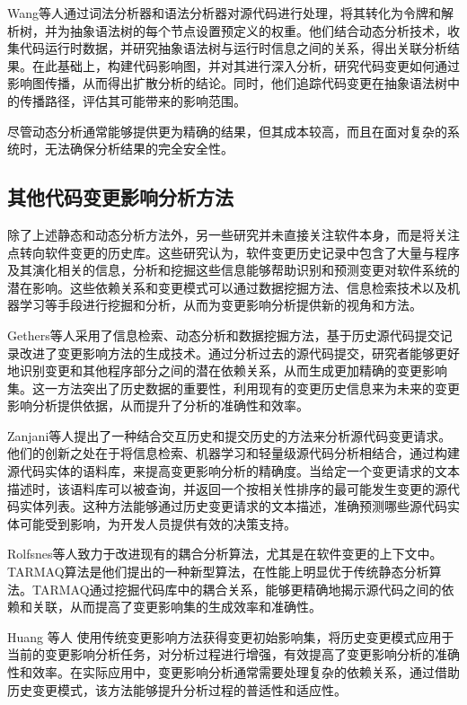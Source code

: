 Wang等人\cite{王海龙0一种基于代码树分析的代码影响范围分析方法}通过词法分析器和语法分析器对源代码进行处理，将其转化为令牌和解析树，并为抽象语法树的每个节点设置预定义的权重。他们结合动态分析技术，收集代码运行时数据，并研究抽象语法树与运行时信息之间的关系，得出关联分析结果。在此基础上，构建代码影响图，并对其进行深入分析，研究代码变更如何通过影响图传播，从而得出扩散分析的结论。同时，他们追踪代码变更在抽象语法树中的传播路径，评估其可能带来的影响范围。

尽管动态分析通常能够提供更为精确的结果，但其成本较高，而且在面对复杂的系统时，无法确保分析结果的完全安全性。

\subsection{其他代码变更影响分析方法}

除了上述静态和动态分析方法外，另一些研究并未直接关注软件本身，而是将关注点转向软件变更的历史库\cite{2011An, Markus2017Supporting, 2008Mining, 2014Impact, 2016Generalizing}。这些研究认为，软件变更历史记录中包含了大量与程序及其演化相关的信息，分析和挖掘这些信息能够帮助识别和预测变更对软件系统的潜在影响。这些依赖关系和变更模式可以通过数据挖掘方法、信息检索技术以及机器学习等手段进行挖掘和分析，从而为变更影响分析提供新的视角和方法。

Gethers等人\cite{2011An}采用了信息检索、动态分析和数据挖掘方法，基于历史源代码提交记录改进了变更影响方法的生成技术。通过分析过去的源代码提交，研究者能够更好地识别变更和其他程序部分之间的潜在依赖关系，从而生成更加精确的变更影响集。这一方法突出了历史数据的重要性，利用现有的变更历史信息来为未来的变更影响分析提供依据，从而提升了分析的准确性和效率。

Zanjani等人\cite{2014Impact}提出了一种结合交互历史和提交历史的方法来分析源代码变更请求。他们的创新之处在于将信息检索、机器学习和轻量级源代码分析相结合，通过构建源代码实体的语料库，来提高变更影响分析的精确度。当给定一个变更请求的文本描述时，该语料库可以被查询，并返回一个按相关性排序的最可能发生变更的源代码实体列表。这种方法能够通过历史变更请求的文本描述，准确预测哪些源代码实体可能受到影响，为开发人员提供有效的决策支持。

Rolfsnes等人\cite{2016Generalizing}致力于改进现有的耦合分析算法，尤其是在软件变更的上下文中。TARMAQ算法是他们提出的一种新型算法，在性能上明显优于传统静态分析算法。TARMAQ通过挖掘代码库中的耦合关系，能够更精确地揭示源代码之间的依赖和关联，从而提高了变更影响集的生成效率和准确性。

Huang 等人 \cite{2021Change} 使用传统变更影响方法获得变更初始影响集，将历史变更模式应用于当前的变更影响分析任务，对分析过程进行增强，有效提高了变更影响分析的准确性和效率。在实际应用中，变更影响分析通常需要处理复杂的依赖关系，通过借助历史变更模式，该方法能够提升分析过程的普适性和适应性。


